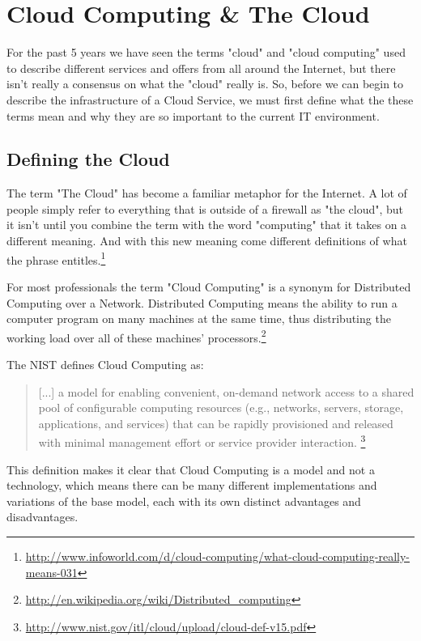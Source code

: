 \chapter{Cloud Computing \& The Cloud}\label{ch:infrastructure}
For the past 5 years we have seen the terms "cloud" and "cloud computing" used to describe different services and offers from all around the Internet, but there isn't really a consensus on what the "cloud" really is. So, before we can begin to describe the infrastructure of a Cloud Service, we must first define what the these terms mean and why they are so important to the current IT environment.

\section{Defining the Cloud}
The term "The Cloud" has become a familiar metaphor for the Internet. A lot of people simply refer to everything that is outside of a firewall as "the cloud", but it isn't until you combine the term with the word "computing" that it takes on a different meaning. And with this new meaning come different definitions of what the phrase entitles.\footnote{\url{http://www.infoworld.com/d/cloud-computing/what-cloud-computing-really-means-031}}

For most professionals the term "Cloud Computing" is a synonym for Distributed Computing over a Network. Distributed Computing means the ability to run a computer program on many machines at the same time, thus distributing the working load over all of these machines' processors.\footnote{\url{http://en.wikipedia.org/wiki/Distributed_computing}}

The \ac{NIST} defines Cloud Computing as:
\begin{quotation}
[...] a model for enabling convenient, on-demand network access to a shared pool of configurable computing resources (e.g., networks, servers, storage, applications, and services) that can be rapidly provisioned and released with minimal management effort or service provider interaction.
\footnote{\url{http://www.nist.gov/itl/cloud/upload/cloud-def-v15.pdf}} 
\end{quotation}

This definition makes it clear that Cloud Computing is a model and not a technology, which means there can be many different implementations and variations of the base model, each with its own distinct advantages and disadvantages.

